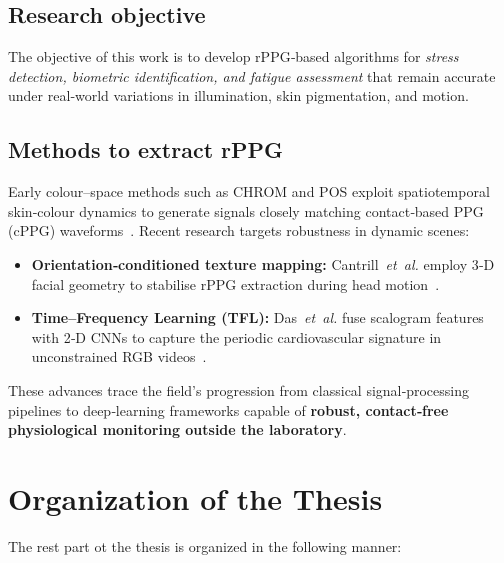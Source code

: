 \subsection{Research objective}

The objective of this work is to develop rPPG‑based algorithms for
\emph{stress detection, biometric identification, and fatigue assessment}
that remain accurate under real‑world variations in illumination, skin pigmentation, and motion.

\subsection{Methods to extract rPPG}

Early colour–space methods such as \textsc{CHROM} and \textsc{POS} exploit spatiotemporal skin‑colour dynamics to generate signals closely matching contact‑based PPG (cPPG) waveforms~\cite{shahmirzadi2025hybrid}.  
Recent research targets robustness in dynamic scenes:

\begin{itemize}
    \item \textbf{Orientation‑conditioned texture mapping:} Cantrill~\textit{et~al.} employ 3‑D facial geometry to stabilise rPPG extraction during head motion~\cite{cantrill2024orientation}.
    \item \textbf{Time–Frequency Learning (TFL):} Das~\textit{et~al.} fuse scalogram features with 2‑D CNNs to capture the periodic cardiovascular signature in unconstrained RGB videos~\cite{das2023time}.
\end{itemize}

These advances trace the field’s progression from classical signal‑processing pipelines to deep‑learning frameworks capable of \textbf{robust, contact‑free physiological monitoring outside the laboratory}.



\section{Organization of the Thesis}
The rest part ot the thesis is organized in the following manner:


